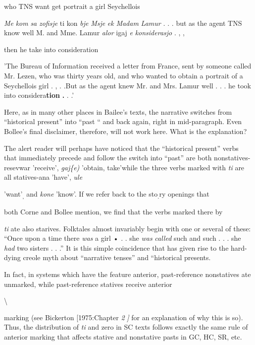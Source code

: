 who TNS want get portrait a girl Seychellois

\textit{Me} \textit{kom} \textit{sa} \textit{zofisje} ti kon \textit{b}\textit{je} \textit{Msje} \textit{ek} \textit{M}\textit{adam} \textit{Lamur} \textit{.} . . but as the agent TNS know well M. and Mme. Lamur \textit{alor} igaj \textit{e} \textit{konsiderasjo} . , ,

then he take into consideration

'The Bureau of Information received a letter from France, sent by someone called Mr. Lezen, who was thirty years old, and who wanted to obtain a portrait of a Seychellois girl . , . .But as the agent knew Mr. and Mrs. Lamur well . . . he took into considera\-\textbf{tion} \textbf{.} . .'

Here, as in many other places in Bailee's texts, the narrative switches from ``historical present'' into ``past `` and back again, right in mid-paragraph. Even Bollee's final disclaimer, therefore, will not work here. What is the explanation?

The alert reader will perhaps have noticed that the ``historical present'' verbs that immediately precede and follow the switch into ``past'' are both nonstatives- resevwar 'receive', \textit{ga}\textit{j}\textit{\{e)} 'obtain, take'\-while the three verbs marked with \textit{ti} are all statives{}-ana 'have', \textit{ule}

'want'\textsubscript{,}\textsubscript{ }and \textit{kone }'know'. If we refer back to the sto\textsubscript{.}ry openings that

both Corne and Bollee mention, we find that the verbs marked there by

\textit{ti} ate also starives. Folktales almost invariably begin with one or several of these: ``Once upon a time there \textit{was }a girl • . . she \textit{was} \textit{called} such and such . . . she \textit{had} two sisters . . .'' It is this simple coincidence that has given rise to the hard-dying creole myth about ``narrative tenses'' and ``historical presents.{\textquotedbl}

In fact, in systems which have the feature anterior, past-reference nonstatives ate unmarked, while past-reference statives receive anterior

{\textbackslash}


marking (see Bickerton [1975:Chapter \textit{2} \textit{]} for an explanation of why this is so). Thus, the distribution of \textit{ti} and zero in SC texts follows exactly the same rule of anterior marking that affects stative and nonstative pasts in GC, HC, SR, etc.

